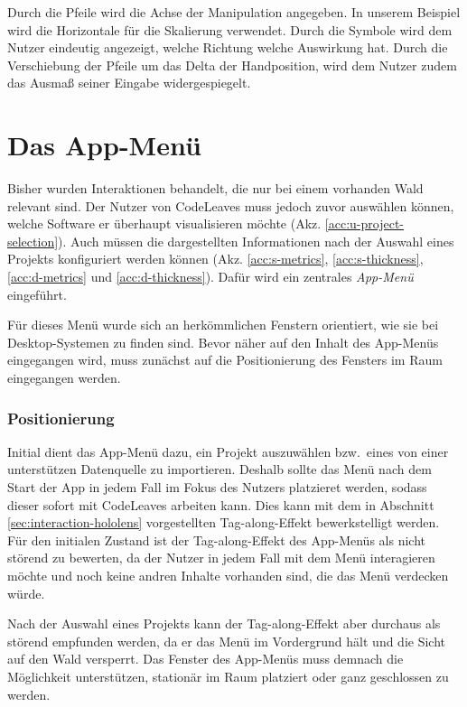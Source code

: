 Durch die Pfeile wird die Achse der Manipulation angegeben. In unserem Beispiel wird die Horizontale für die Skalierung verwendet. Durch die Symbole wird dem Nutzer eindeutig angezeigt, welche Richtung welche Auswirkung hat. Durch die Verschiebung der Pfeile um das Delta der Handposition, wird dem Nutzer zudem das Ausmaß seiner Eingabe widergespiegelt.

\section{Das App-Menü}
\label{sec:app-menu}

Bisher wurden Interaktionen behandelt, die nur bei einem vorhanden Wald relevant sind. Der Nutzer von CodeLeaves muss jedoch zuvor auswählen können, welche Software er überhaupt visualisieren möchte (Akz. \ref{acc:u-project-selection}). Auch müssen die dargestellten Informationen nach der Auswahl eines Projekts konfiguriert werden können (Akz. \ref{acc:s-metrics}, \ref{acc:s-thickness}, \ref{acc:d-metrics} und \ref{acc:d-thickness}). Dafür wird ein zentrales \textit{App-Menü} eingeführt.

Für dieses Menü wurde sich an herkömmlichen Fenstern orientiert, wie sie bei Desktop-Systemen zu finden sind. Bevor näher auf den Inhalt des App-Menüs eingegangen wird, muss zunächst auf die Positionierung des Fensters im Raum eingegangen werden.

\subsubsection*{Positionierung}

Initial dient das App-Menü dazu, ein Projekt auszuwählen bzw.\ eines von einer unterstützen Datenquelle zu importieren. Deshalb sollte das Menü nach dem Start der App in jedem Fall im Fokus des Nutzers platzieret werden, sodass dieser sofort mit CodeLeaves arbeiten kann. Dies kann mit dem in Abschnitt \ref{sec:interaction-hololens} vorgestellten Tag-along-Effekt bewerkstelligt werden. Für den initialen Zustand ist der Tag-along-Effekt des App-Menüs als nicht störend zu bewerten, da der Nutzer in jedem Fall mit dem Menü interagieren möchte und noch keine andren Inhalte vorhanden sind, die das Menü verdecken würde.

Nach der Auswahl eines Projekts kann der Tag-along-Effekt aber durchaus als störend empfunden werden, da er das Menü im Vordergrund hält und die Sicht auf den Wald versperrt. Das Fenster des App-Menüs muss demnach die Möglichkeit unterstützen, stationär im Raum platziert oder ganz geschlossen zu werden.

